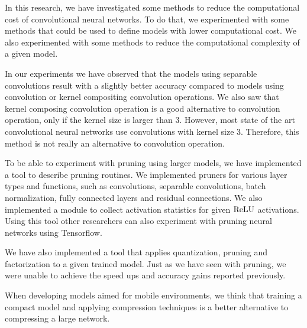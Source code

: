 
\iffalse
    What is the strongest and most important statement that you can make from your observations? 
    If you met the reader at a meeting six months from now, what do you want them to remember about your paper? 
    Refer back to problem posed, and describe the conclusions that you reached from carrying out this investigation, summarize new observations, new interpretations, and new insights that have resulted from the present work.
    Include the broader implications of your results. 
    Do not repeat word for word the abstract, introduction or discussion.
\fi


In this research, we have investigated some methods to reduce the computational cost of convolutional neural networks. To do that, we experimented with some methods that could be used to define models with lower computational cost. We also experimented with some methods to reduce the computational complexity of a given model. 

In our experiments we have observed that the models using separable convolutions result with a slightly better accuracy compared to models using convolution or kernel compositing convolution operations. We also saw that kernel composing convolution operation is a good alternative to convolution operation, only if the kernel size is larger than 3. However, most state of the art convolutional neural networks use convolutions with kernel size 3. Therefore, this method is not really an alternative to convolution operation. 

To be able to experiment with pruning using larger models, we have implemented a tool to describe pruning routines. We implemented pruners for various layer types and functions, such as convolutions, separable convolutions, batch normalization, fully connected layers and residual connections. We also implemented a module to collect activation statistics for given $\textrm{ReLU}$ activations. Using this tool other researchers can also experiment with pruning neural networks using Tensorflow. 

We have also implemented a tool that applies quantization, pruning and factorization to a given trained model. Just as we have seen with pruning, we were unable to achieve the speed ups and accuracy gains reported previously.

When developing models aimed for mobile environments, we think that training a compact model and applying compression techniques is a better alternative to compressing a large network.

